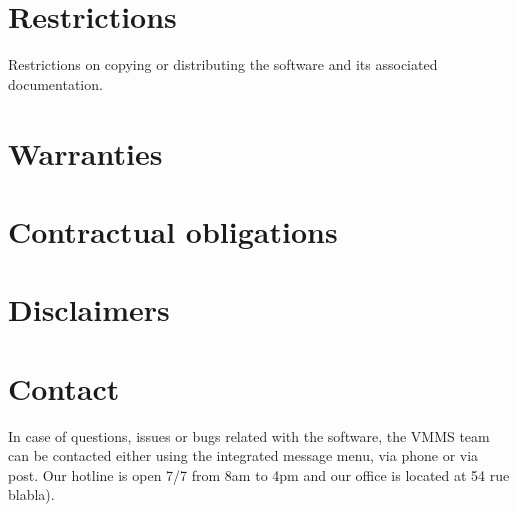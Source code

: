 \section{Restrictions}
Restrictions on copying or distributing the software and its associated
documentation.

\section{Warranties}

\section{Contractual obligations}

\section{Disclaimers}

\section{Contact}
In case of questions, issues or bugs related with the software, the VMMS team
can be contacted either using the integrated message menu, via phone or via
post. Our hotline is open 7/7 from 8am to 4pm and our office is located
at 54 rue blabla).
